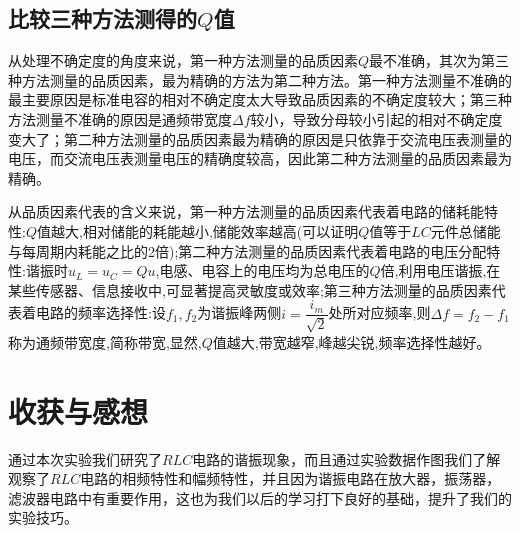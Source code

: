 \documentclass[a4 paper,12pt]{article}
\begin{document}
\subsection{比较三种方法测得的$Q$值}
从处理不确定度的角度来说，第一种方法测量的品质因素$Q$最不准确，其次为第三种方法测量的品质因素，最为精确的方法为第二种方法。第一种方法测量不准确的最主要原因是标准电容的相对不确定度太大导致品质因素的不确定度较大；第三种方法测量不准确的原因是通频带宽度$\Delta f$较小，导致分母较小引起的相对不确定度变大了；第二种方法测量的品质因素最为精确的原因是只依靠于交流电压表测量的电压，而交流电压表测量电压的精确度较高，因此第二种方法测量的品质因素最为精确。
\par 从品质因素代表的含义来说，第一种方法测量的品质因素代表着电路的储耗能特性:$Q$值越大,相对储能的耗能越小,储能效率越高(可以证明$Q$值等于$LC$元件总储能与每周期内耗能之比的2倍);第二种方法测量的品质因素代表着电路的电压分配特性:谐振时$u_{L}=u_{C}=Qu$,电感、电容上的电压均为总电压的$Q$倍,利用电压谐振,在某些传感器、信息接收中,可显著提高灵敏度或效率;第三种方法测量的品质因素代表着电路的频率选择性:设$f_{1},f_{2}$为谐振峰两侧$i=\dfrac{i_{m}}{\sqrt{2}}$处所对应频率,则$\Delta f=f_{2}-f_{1}$称为通频带宽度,简称带宽,显然,$Q$值越大,带宽越窄,峰越尖锐,频率选择性越好。
\section{收获与感想}
通过本次实验我们研究了$RLC$电路的谐振现象，而且通过实验数据作图我们了解观察了$RLC$电路的相频特性和幅频特性，并且因为谐振电路在放大器，振荡器，滤波器电路中有重要作用，这也为我们以后的学习打下良好的基础，提升了我们的实验技巧。
\end{document}
